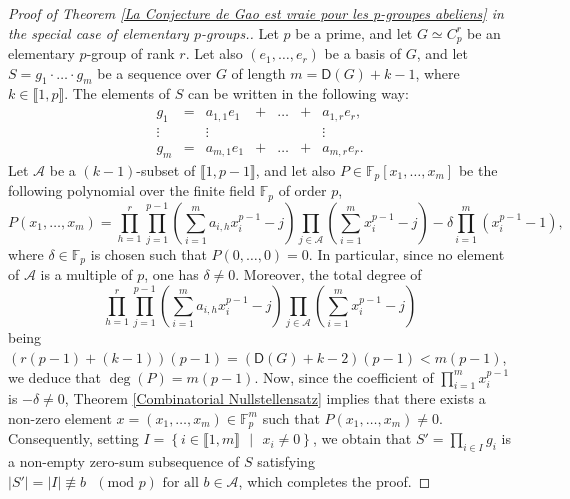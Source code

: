 \documentclass[english,12pt,a4paper,twoside]{smfart}
\theoremstyle{plain}
\theoremstyle{definition}
\theoremstyle{remark}
\begin{document}
\begin{proof}[Proof of Theorem \ref{La Conjecture de Gao est vraie pour les p-groupes abeliens} in the special case of elementary $p$-groups.] Let $p$ be a prime, and let $G \simeq C^r_p$ be an elementary $p$-group of rank $r$. Let also $(e_1,\dots,e_r)$ be a basis of $G$, and let $S=g_1 \cdot \hdots \cdot g_m$ be a sequence over $G$ of length $m=\mathsf{D}(G)+k-1$, where $k \in \llbracket 1,p \rrbracket$. The elements of $S$ can be written in the following way:
$$\begin{array}{ccccccc}
g_1 & = & a_{1,1}e_1 & + & \dots & + & a_{1,r}e_r,\\
\vdots & & \vdots & & & &  \vdots\\
g_m & = & a_{m,1}e_1 & + & \dots & + & a_{m,r}e_r.
\end{array}$$
Let $\mathcal{A}$ be a $(k-1)$-subset of $\llbracket 1,p-1 \rrbracket$, and let also $P \in \mathbb{F}_p \left[x_1,\dots,x_m\right]$ be the following polynomial over the finite field $\mathbb{F}_p$ of order $p$,
$$P(x_1,\dots,x_m)=\displaystyle\prod^r_{h=1}\displaystyle\prod^{p-1}_{j=1}\left(\displaystyle\sum^m_{i=1}a_{i,h}x^{p-1}_i - j\right) \displaystyle\prod_{j \in \mathcal{A}}\left(\displaystyle\sum^{m}_{i=1}x^{p-1}_i -j\right)-\delta\displaystyle\prod^m_{i=1}\left(x^{p-1}_i-1\right),$$
where $\delta \in \mathbb{F}_p$ is chosen such that $P(0,\dots,0)=0$. In particular, since no element of $\mathcal{A}$ is a multiple of $p$, one has $\delta \neq 0$. Moreover, the total degree of $$\displaystyle\prod^r_{h=1}\displaystyle\prod^{p-1}_{j=1}\left(\displaystyle\sum^m_{i=1}a_{i,h}x^{p-1}_i - j\right) \displaystyle\prod_{j \in \mathcal{A}}\left(\displaystyle\sum^{m}_{i=1}x^{p-1}_i -j\right)$$ 
being $\left(r(p-1)+(k-1)\right)\left(p-1\right)=\left(\mathsf{D}(G)+k-2\right)\left(p-1\right)< m(p-1)$, we deduce that $\deg(P)=m(p-1)$. Now, since the coefficient of $\prod^m_{i=1}x^{p-1}_i$ is $-\delta \neq 0$, Theorem \ref{Combinatorial Nullstellensatz} implies that there exists a non-zero element $x=(x_1,\dots,x_m) \in \mathbb{F}^m_p $ such that $P(x_1,\dots,x_m) \neq 0$. Consequently, setting $I=\left\{i \in \llbracket 1,m \rrbracket \text{ } | \text{ } x_i \neq 0 \right\}$, we obtain that $S'=\prod_{i \in I}g_i$ is a non-empty zero-sum subsequence of $S$ satisfying $\left|S'\right| = \left|I\right| \not\equiv b \text{ } (\text{mod } p) \text{ for all } b  \in \mathcal{A}$, which completes the proof. 
\end{proof}
\end{document}
